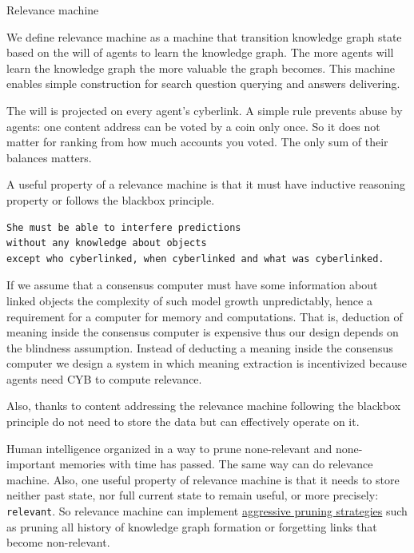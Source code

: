 \documentclass[10pt,oneside]{amsart}
\makeatletter
\def\section{\@startsection{section}{1}%
  \z@{.7\linespacing\@plus\linespacing}{.5\linespacing}%
  {\normalfont\scshape}}%
\makeatother
\begin{document}
\section{Relevance machine}\label{Relevance machine}

We define relevance machine as a machine that transition knowledge graph state based on the will of agents to learn the knowledge graph. The more agents will learn the knowledge graph the more valuable the graph becomes. This machine enables simple construction for search question querying and answers delivering.

The will is projected on every agent's cyberlink. A simple rule prevents abuse by agents: one content address can be voted by a coin only once. So it does not matter for ranking from how much accounts you voted. The only sum of their balances matters.

A useful property of a relevance machine is that it must have inductive reasoning property or follows the blackbox principle.

\begin{lstlisting}
She must be able to interfere predictions
without any knowledge about objects
except who cyberlinked, when cyberlinked and what was cyberlinked.
\end{lstlisting}

If we assume that a consensus computer must have some information about linked objects the complexity of such model growth unpredictably, hence a requirement for a computer for memory and computations. That is, deduction of meaning inside the consensus computer is expensive thus our design depends on the blindness assumption. Instead of deducting a meaning inside the consensus computer we design a system in which meaning extraction is incentivized because agents need CYB to compute relevance.

Also, thanks to content addressing the relevance machine following the blackbox principle do not need to store the data but can effectively operate on it.

Human intelligence organized in a way to prune none-relevant and none-important memories with time has passed. 
The same way can do relevance machine. Also, one useful property of relevance machine is that it needs to store neither past state, nor full current state to remain useful, or more precisely: \verb|relevant|. So relevance machine can implement \href{https://ipfs.io/ipfs/QmP81EcuNDZHQutvdcDjbQEqiTYUzU315aYaTyrVj6gtJb}{aggressive pruning strategies} such as pruning all history of knowledge graph formation or forgetting links that become non-relevant.
\end{document}
